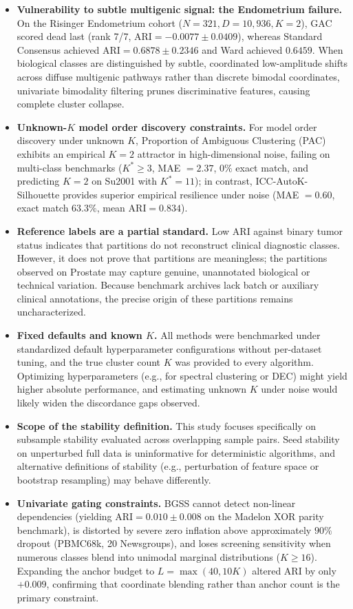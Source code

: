 \documentclass[pdflatex,sn-mathphys-num]{sn-jnl}
\theoremstyle{thmstyleone}
\theoremstyle{thmstyletwo}
\theoremstyle{thmstylethree}
\begin{document}
\begin{itemize}
\item \textbf{Vulnerability to subtle multigenic signal: the Endometrium failure.} On the Risinger Endometrium cohort ($N=321, D=10{,}936, K=2$), GAC scored dead last (rank 7/7, $\text{ARI} = -0.0077 \pm 0.0409$), whereas Standard Consensus achieved $\text{ARI} = 0.6878 \pm 0.2346$ and Ward achieved $0.6459$. When biological classes are distinguished by subtle, coordinated low-amplitude shifts across diffuse multigenic pathways rather than discrete bimodal coordinates, univariate bimodality filtering prunes discriminative features, causing complete cluster collapse.
\item \textbf{Unknown-$K$ model order discovery constraints.} For model order discovery under unknown $K$, Proportion of Ambiguous Clustering (PAC) exhibits an empirical $K=2$ attractor in high-dimensional noise, failing on multi-class benchmarks ($K^* \ge 3$, MAE $= 2.37$, $0\%$ exact match, and predicting $K=2$ on Su2001 with $K^*=11$); in contrast, ICC-AutoK-Silhouette provides superior empirical resilience under noise (MAE $= 0.60$, exact match $63.3\%$, mean $\text{ARI} = 0.834$).
\item \textbf{Reference labels are a partial standard.} Low ARI against binary tumor status indicates that partitions do not reconstruct clinical diagnostic classes. However, it does not prove that partitions are meaningless; the partitions observed on Prostate may capture genuine, unannotated biological or technical variation. Because benchmark archives lack batch or auxiliary clinical annotations, the precise origin of these partitions remains uncharacterized.
    \item \textbf{Fixed defaults and known $K$.} All methods were benchmarked under standardized default hyperparameter configurations without per-dataset tuning, and the true cluster count $K$ was provided to every algorithm. Optimizing hyperparameters (e.g., for spectral clustering or DEC) might yield higher absolute performance, and estimating unknown $K$ under noise would likely widen the discordance gaps observed.
    \item \textbf{Scope of the stability definition.} This study focuses specifically on subsample stability evaluated across overlapping sample pairs. Seed stability on unperturbed full data is uninformative for deterministic algorithms, and alternative definitions of stability (e.g., perturbation of feature space or bootstrap resampling) may behave differently.
    \item \textbf{Univariate gating constraints.} BGSS cannot detect non-linear dependencies (yielding $\text{ARI} = 0.010 \pm 0.008$ on the Madelon XOR parity benchmark), is distorted by severe zero inflation above approximately $90\%$ dropout (PBMC68k, 20 Newsgroups), and loses screening sensitivity when numerous classes blend into unimodal marginal distributions ($K \ge 16$). Expanding the anchor budget to $L = \max(40, 10K)$ altered ARI by only $+0.009$, confirming that coordinate blending rather than anchor count is the primary constraint.

\end{itemize}
\end{document}
